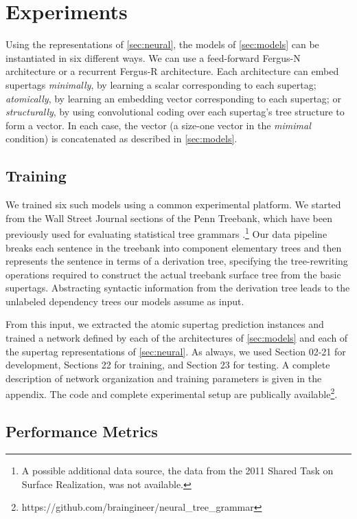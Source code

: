 \documentclass[11pt]{article}
\begin{document}
\section{Experiments}
\label{sec:expt}

Using the representations of \ref{sec:neural}, the models of
\ref{sec:models} can be instantiated in six different ways.  We can
use a feed-forward Fergus-N architecture or a recurrent Fergus-R
architecture.  Each architecture can embed supertags \emph{minimally},
by learning a scalar corresponding to each supertag; \emph{atomically}, by learning an
embedding vector corresponding to each supertag; or
\emph{structurally}, by using convolutional coding over each
supertag's tree structure to form a vector.
%
In each case, the vector (a size-one vector in the \emph{mimimal} condition) is concatenated as described in \ref{sec:models}.

\subsection{Training}

We trained six such models using a common experimental platform.  We
started from the Wall Street Journal sections of the Penn Treebank,
which have been previously used for evaluating statistical tree
grammars \cite{chiang2000statistical}.\footnote{A possible additional
  data source, the data from the 2011 Shared Task on Surface
  Realization, was not available.}
%
Our data pipeline breaks each sentence in the treebank into component
elementary trees and then represents the sentence in terms of a
derivation tree, specifying the tree-rewriting operations required to
construct the actual treebank surface tree from the basic supertags.
%
Abstracting syntactic information from the derivation tree leads to
the unlabeled dependency trees our models assume as input.

From this input, we extracted the atomic supertag prediction instances
and trained a network defined by each of the architectures of
\ref{sec:models} and each of the supertag representations of
\ref{sec:neural}.  As always, we used Section 02-21 for development,
Sections 22 for training, and Section 23 for testing.  A complete
description of network organization and training parameters is given
in the appendix.  The code and complete experimental setup are publically available\footnote{https://github.com/braingineer/neural\_tree\_grammar}.

\subsection{Performance Metrics}
\end{document}
